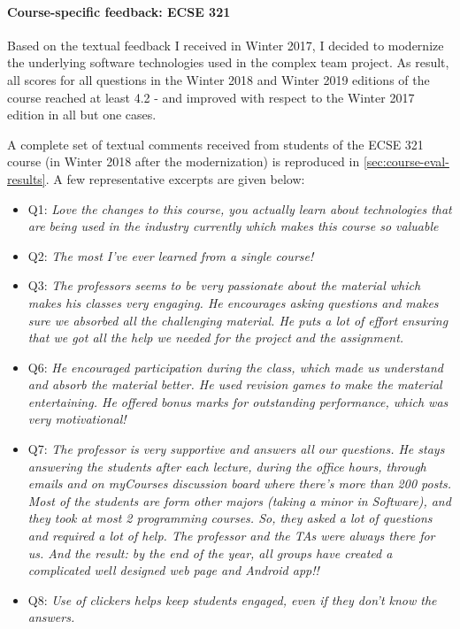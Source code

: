 \paragraph{Course-specific feedback: ECSE 321}
Based on the textual feedback I received in Winter 2017, I decided to modernize the underlying software technologies used in the complex team project. As result, all scores for all questions in the Winter 2018 and Winter 2019 editions of the course reached at least 4.2 - and improved with respect to the Winter 2017 edition in all but one cases. 

A complete set of textual comments received from students of the ECSE 321 course (in Winter 2018 after the modernization) is reproduced in \autoref{sec:course-eval-results}. A few representative excerpts are given below:

\begin{itemize}[leftmargin=0.5cm]
\item Q1: \emph{ Love the changes to this course, you actually learn about technologies that are being used in the industry currently which makes this course so valuable }
\item Q2: \emph{The most I've ever learned from a single course! }
\item Q3: \emph{The professors seems to be very passionate about the material which makes his classes very engaging. He encourages asking questions and makes sure we absorbed all the challenging material. He puts a lot of effort ensuring that we got all the help we needed for the project and the assignment. }
\item Q6: \emph{He encouraged participation during the class, which made us understand and absorb the material better. He used revision games to make the material entertaining. He offered bonus marks for outstanding performance, which was very motivational! }
\item Q7: \emph{The professor is very supportive and answers all our questions. He stays answering the students after each lecture, during the office hours, through emails and on myCourses discussion board where there's more than 200 posts. Most of the students are form other majors (taking a minor in Software), and they took at most 2 programming courses. So, they asked a lot of questions and required a lot of help. The professor and the TAs were always there for us. And the result: by the end of the year, all groups have created a complicated well designed web page and Android app!! }
\item Q8: \emph{Use of clickers helps keep students engaged, even if they don't know the answers. }

\end{itemize}
